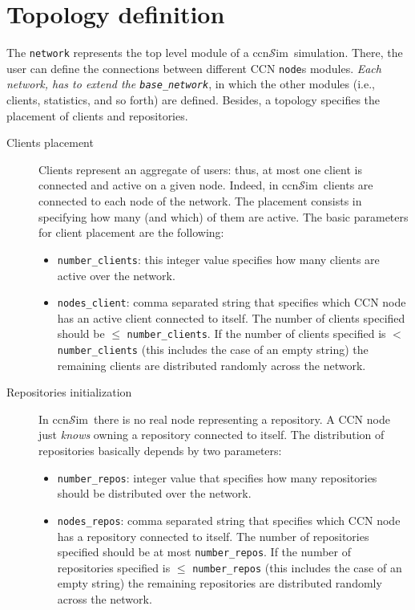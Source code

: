 \documentclass{book}
\newcommand{\ccnsim}{ccn$\mathcal{S}$im}
\begin{document}
\section{Topology definition}
The \texttt{network} represents the top level module of a \ccnsim\ simulation. There, the user can define the connections between different CCN \verb|node|s modules. \emph{Each network, has to extend the \texttt{base\_network}}, in which the other modules (i.e., clients, statistics, and so forth)  are defined. Besides, a topology specifies the placement of clients and repositories.
\begin{description}
    \item[Clients placement] Clients represent an aggregate of users: thus, at most one client is connected and active on a given node. Indeed, in \ccnsim\ clients are connected to each node of the network. The placement consists in specifying how many (and which) of them are active. The basic parameters for client placement are the following:
	\begin{itemize}
	    \item \verb|number_clients|: this integer value specifies how many clients are active over the network. 
	    \item \verb|nodes_client|: comma separated string that specifies which CCN node has an active client connected to itself.  The number of clients specified should be $\leq$ \verb|number_clients|. If the number of clients specified is $<$ \verb|number_clients| (this includes the case of an empty string) the remaining clients are distributed randomly across the network. 
	\end{itemize}
    \item[Repositories initialization]  In \ccnsim\ there is no real node representing a repository. A CCN node just  \emph{knows} owning a repository connected to itself. The distribution of repositories basically depends by two parameters:
	\begin{itemize}
	    \item \verb|number_repos|: integer value that specifies how many repositories should be distributed over the network.
	    \item \verb|nodes_repos|: comma separated string that specifies which CCN node has a repository connected to itself.  The number of repositories specified should be at most \verb|number_repos|. If the number of repositories specified is $\leq$ \verb|number_repos| (this includes the case of an empty string) the remaining repositories are distributed randomly across the network. 
	\end{itemize}
\end{description}
\end{document}
